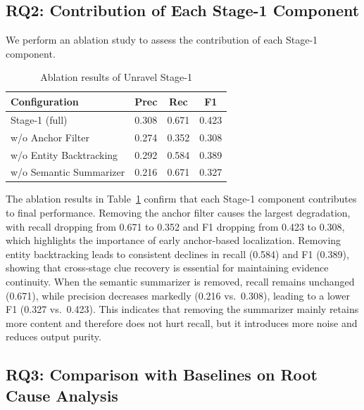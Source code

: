 \documentclass[sigconf,anonymous]{acmart}
\begin{document}
\subsection{RQ2: Contribution of Each Stage-1 Component}

We perform an ablation study to assess the contribution of each Stage-1 component.

\begin{table}[htbp]
\centering
\caption{Ablation results of Unravel Stage-1}
\label{tab:mgsc-ablation}
\begin{tabular}{lccc}
\hline
\textbf{Configuration} & \textbf{Prec} & \textbf{Rec} & \textbf{F1} \\
\hline
Stage-1 (full) & 0.308 & 0.671 & 0.423 \\
w/o Anchor Filter & 0.274 & 0.352 & 0.308 \\
w/o Entity Backtracking & 0.292 & 0.584 & 0.389 \\
w/o Semantic Summarizer & 0.216 & 0.671 & 0.327 \\
\hline
\end{tabular}
\end{table}

The ablation results in Table~\ref{tab:mgsc-ablation} confirm that each Stage-1 component contributes to final performance. Removing the anchor filter causes the largest degradation, with recall dropping from 0.671 to 0.352 and F1 dropping from 0.423 to 0.308, which highlights the importance of early anchor-based localization. Removing entity backtracking leads to consistent declines in recall (0.584) and F1 (0.389), showing that cross-stage clue recovery is essential for maintaining evidence continuity. When the semantic summarizer is removed, recall remains unchanged (0.671), while precision decreases markedly (0.216 vs.\ 0.308), leading to a lower F1 (0.327 vs.\ 0.423). This indicates that removing the summarizer mainly retains more content and therefore does not hurt recall, but it introduces more noise and reduces output purity.

\subsection{RQ3: Comparison with Baselines on Root Cause Analysis}
\end{document}
